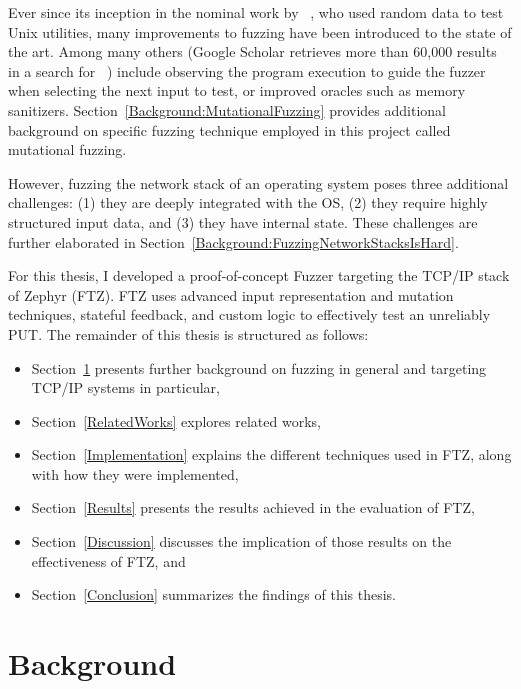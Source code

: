 \documentclass{article}
\newcommand{\proj}{FTZ\xspace}
\let\savedCite=\cite
\renewcommand{\cite}{\unskip~\savedCite}
\begin{document}
\begin{multicols}{2}
  Ever since its inception in the nominal work by \citeauthor{UNIX}\cite{UNIX}, who used random data to test Unix utilities, many improvements to fuzzing have been introduced to the state of the art. Among many others (Google Scholar retrieves more than 60,000 results in a search for \cite{GoogleScholarFuzzing}) include observing the program execution to guide the fuzzer when selecting the next input to test, or improved oracles such as memory sanitizers. Section~\ref{Background:MutationalFuzzing} provides additional background on specific fuzzing technique employed in this project called mutational fuzzing.

  However, fuzzing the network stack of an operating system poses three additional challenges: (1) they are deeply integrated with the OS, (2) they require highly structured input data, and (3) they have internal state. These challenges are further elaborated in Section~\ref{Background:FuzzingNetworkStacksIsHard}.

  For this thesis, I developed a proof-of-concept Fuzzer targeting the TCP/IP stack of Zephyr (\proj). \proj uses advanced input representation and mutation techniques, stateful feedback, and custom logic to effectively test an unreliably PUT. The remainder of this thesis is structured as follows:

  \begin{itemize}
    \item Section~\ref{Background} presents further background on fuzzing in general and targeting TCP/IP systems in particular,
    \item Section~\ref{RelatedWorks} explores related works,
    \item Section~\ref{Implementation} explains the different techniques used in \proj, along with how they were implemented,
    \item Section~\ref{Results} presents the results achieved in the evaluation of \proj,
    \item Section~\ref{Discussion} discusses the implication of those results on the effectiveness of \proj, and
    \item Section~\ref{Conclusion} summarizes the findings of this thesis.
  \end{itemize}


  \section{Background}
  \label{Background}


\end{multicols}
\end{document}
